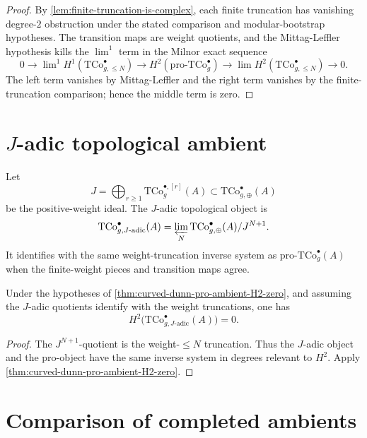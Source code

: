 \begin{proof}
By \autoref{lem:finite-truncation-is-complex}, each finite
truncation has vanishing degree-\(2\) obstruction under the stated
comparison and modular-bootstrap hypotheses. The transition maps are
weight quotients, and the Mittag-Leffler hypothesis kills the
\(\lim^{1}\) term in the Milnor exact sequence
\[
0\to
\lim\nolimits^{1}H^{1}(\mathrm{TCo}^{\bullet}_{g,\le N})
\to
H^{2}(\mathrm{pro}\text{-}\mathrm{TCo}^{\bullet}_{g})
\to
\lim H^{2}(\mathrm{TCo}^{\bullet}_{g,\le N})
\to0.
\]
The left term vanishes by Mittag-Leffler and the right term vanishes
by the finite-truncation comparison; hence the middle term is zero.
\end{proof}

\section{\(J\)-adic topological ambient}
\label{sec:j-adic-ambient}

\begin{definition}
\label{def:j-adic-complex}
Let
\[
J=\bigoplus_{r\ge1}\mathrm{TCo}^{\bullet,[r]}_{g}(A)
\subset \mathrm{TCo}^{\bullet}_{g,\oplus}(A)
\]
be the positive-weight ideal. The \(J\)-adic topological object is
\[
 \mathrm{TCo}^{\bullet}_{g,J\text{-adic}}(A)
 =
 \varprojlim_{N}
 \mathrm{TCo}^{\bullet}_{g,\oplus}(A)/J^{N+1}.
\]
It identifies with the same weight-truncation inverse system as
\(\mathrm{pro}\text{-}\mathrm{TCo}^{\bullet}_{g}(A)\) when the
finite-weight pieces and transition maps agree.
\end{definition}

\begin{theorem}
\label{thm:curved-dunn-J-adic-H2-zero}
Under the hypotheses of
\autoref{thm:curved-dunn-pro-ambient-H2-zero}, and assuming the
\(J\)-adic quotients identify with the weight truncations, one has
\[
 H^{2}\bigl(\mathrm{TCo}^{\bullet}_{g,J\text{-adic}}(A)\bigr)=0.
\]
\end{theorem}

\begin{proof}
The \(J^{N+1}\)-quotient is the weight-\(\le N\) truncation. Thus
the \(J\)-adic object and the pro-object have the same inverse
system in degrees relevant to \(H^{2}\). Apply
\autoref{thm:curved-dunn-pro-ambient-H2-zero}.
\end{proof}

\section{Comparison of completed ambients}
\label{sec:three-ambients-agree}

